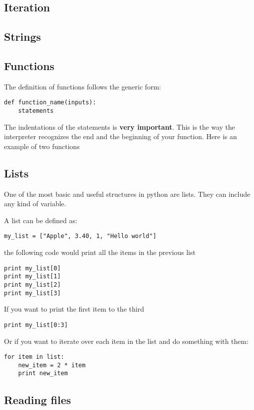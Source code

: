 \documentclass{article}
\begin{document}



\subsection{Iteration}

\subsection{Strings}

\subsection{Functions}

The definition of functions follows the generic form:

\begin{verbatim}
def function_name(inputs):
    statements
\end{verbatim}

The indentations of the statements is {\bf very important}.  This is
the way the interpreter recognizes the end and the beginning of your
function. Here is an example of two functions   




\subsection{Lists}
One of the most basic and useful structures in python are lists. They
can include any kind of variable.

A list can be defined as:
\begin{verbatim}
my_list = ["Apple", 3.40, 1, "Hello world"]
\end{verbatim}

the following code would print all the items in the previous list
\begin{verbatim}
print my_list[0]
print my_list[1]
print my_list[2]
print my_list[3]
\end{verbatim}

If you want to print the first item to the third

\begin{verbatim}
print my_list[0:3]
\end{verbatim}

Or if you want to iterate over each item in the list and do something
with them:

\begin{verbatim}
for item in list:
    new_item = 2 * item
    print new_item
\end{verbatim}

\subsection{Reading files}


\end{document}
